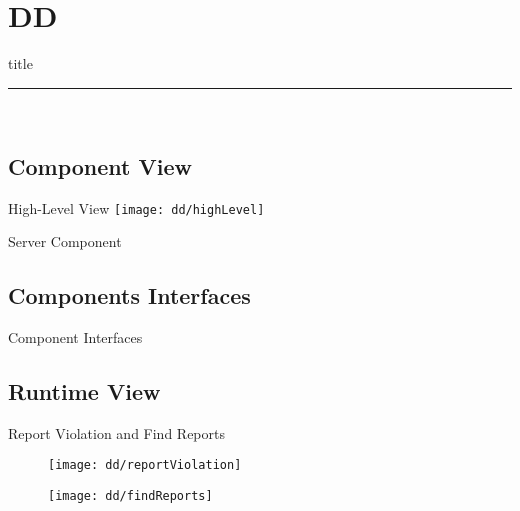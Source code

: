 \section{DD}

	\begin{frame}[plain]
		\vfill
		\centering
		\begin{beamercolorbox}[sep=8pt,center,shadow=true,rounded=true]{title}
			\textbf{\insertsectionhead}\par%
			\color{polimiblue}\noindent\rule{10cm}{1pt} \\
		\end{beamercolorbox}
		\vfill
	\end{frame}

	\subsection{Component View}
		\begin{frame}{High-Level View}
			\centering
			\texttt{[image: dd/highLevel]}
		\end{frame}
	
		\begin{frame}{Server Component}
			\noindent{}
		\end{frame}
	
	\subsection{Components Interfaces}
		\begin{frame}{Component Interfaces}
			\vspace{-6pt}
			\noindent{}
		\end{frame}
	
	\subsection{Runtime View}
		\begin{frame}{Report Violation and Find Reports}
			\vspace{-5pt}
			\begin{figure}
				\centering
				\texttt{[image: dd/reportViolation]}
			\end{figure}
			\vspace{-10pt}
			\begin{figure}
				\centering
				\texttt{[image: dd/findReports]}
			\end{figure}
		\end{frame}
	
